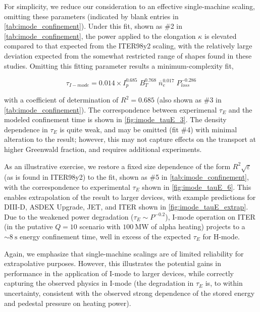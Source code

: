 For simplicity, we reduce our consideration to an effective single-machine scaling, omitting these parameters (indicated by blank entries in \cref{tab:imode_confinement}).  Under this fit, shown as \#2 in \cref{tab:imode_confinement}, the power applied to the elongation $\kappa$ is elevated compared to that expected from the ITER98y2 scaling, with the relatively large deviation expected from the somewhat restricted range of shapes found in these studies.  Omitting this fitting parameter results a minimum-complexity fit,

\begin{equation}\label{eq:tauE_fit_3}
 \tau_{I-mode} = 0.014 \times I_p^{0.685} \; B_T^{0.768} \; \overline{n}_e^{0.017} \; P_{loss}^{-0.286}
\end{equation}

\noindent with a coefficient of determination of $R^2 = 0.685$ (also shown as \#3 in \cref{tab:imode_confinement}).  The correspondence between experimenal $\tau_E$ and the modeled confinement time is shown in \cref{fig:imode_tauE_3}.  The density dependence in $\tau_E$ is quite weak, and may be omitted (fit \#4) with minimal alteration to the result; however, this may not capture effects on the transport at higher Greenwald fraction, and requires additional experiments.

As an illustrative exercise, we restore a fixed size dependence of the form $R^2 \sqrt{\varepsilon}$ (as is found in ITER98y2) to the fit, shown as \#5 in \cref{tab:imode_confinement}, with the correspondence to experimental $\tau_E$ shown in \cref{fig:imode_tauE_6}.  This enables extrapolation of the result to larger devices, with example predictions for DIII-D, ASDEX Upgrade, JET, and ITER shown in \cref{fig:imode_tauE_extrap}.  Due to the weakened power degradation ($\tau_E \sim P^{-0.2}$), I-mode operation on ITER (in the putative $Q=10$ scenario with $\SI{100}{\mega\watt}$ of alpha heating) projects to a $\sim \SI{8}{\second}$ energy confinement time, well in excess of the expected $\tau_E$ for H-mode.

Again, we emphasize that single-machine scalings are of limited reliability for extrapolative purposes.  However, this illustrates the potential gains in performance in the application of I-mode to larger devices, while correctly capturing the observed physics in I-mode (\eg the degradation in $\tau_E$ is, to within uncertainty, consistent with the observed strong dependence of the stored energy and pedestal pressure on heating power).

